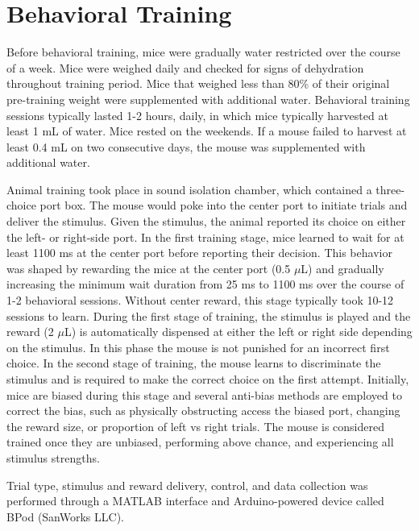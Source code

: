 \section{Behavioral Training}
Before behavioral training, mice were gradually water restricted over the course of a week. Mice were weighed daily and checked for signs of dehydration throughout training period. Mice that weighed less than 80\% of their original pre-training weight were supplemented with additional water. Behavioral training sessions typically lasted 1-2 hours, daily, in which mice typically harvested at least 1 mL of water. Mice rested on the weekends. If a mouse failed to harvest at least 0.4 mL on two consecutive days, the mouse was supplemented with additional water.\par
Animal training took place in sound isolation chamber, which contained a three-choice port box. The mouse would poke into the center port to initiate trials and deliver the stimulus. Given the stimulus, the animal reported its choice on either the left- or right-side port. In the first training stage, mice learned to wait for at least 1100 ms at the center port before reporting their decision. This behavior was shaped by rewarding the mice at the center port (0.5 $\mu $L) and gradually increasing the minimum wait duration from 25 ms to 1100 ms over the course of 1-2 behavioral sessions. Without center reward, this stage typically took 10-12 sessions to learn. During the first stage of training, the stimulus is played and the reward (2 $\mu$L) is automatically dispensed at either the left or right side depending on the stimulus. In this phase the mouse is not punished for an incorrect first choice.  In the second stage of training, the mouse learns to discriminate the stimulus and is required to make the correct choice on the first attempt. Initially, mice are biased during this stage and several anti-bias methods are employed to correct the bias, such as physically obstructing access the biased port, changing the reward size, or proportion of left vs right trials. The mouse is considered trained once they are unbiased, performing above chance, and experiencing all stimulus strengths.\par
Trial type, stimulus and reward delivery, control, and data collection was performed through a MATLAB interface and Arduino-powered device called BPod (SanWorks LLC).\par 

